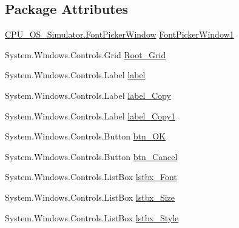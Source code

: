 \subsection*{Package Attributes}
\begin{DoxyCompactItemize}
\item 
\hyperlink{class_c_p_u___o_s___simulator_1_1_font_picker_window}{C\+P\+U\+\_\+\+O\+S\+\_\+\+Simulator.\+Font\+Picker\+Window} \hyperlink{class_c_p_u___o_s___simulator_1_1_font_picker_window_afb8444d85c5401e08689ca4ad477703a}{Font\+Picker\+Window1}
\item 
System.\+Windows.\+Controls.\+Grid \hyperlink{class_c_p_u___o_s___simulator_1_1_font_picker_window_a549891835e07203b79f3e81fb225c596}{Root\+\_\+\+Grid}
\item 
System.\+Windows.\+Controls.\+Label \hyperlink{class_c_p_u___o_s___simulator_1_1_font_picker_window_ada73b11773a6ec5fbddb19ee96bb131b}{label}
\item 
System.\+Windows.\+Controls.\+Label \hyperlink{class_c_p_u___o_s___simulator_1_1_font_picker_window_a25630ec7b1b5e76da6c7296d267067c9}{label\+\_\+\+Copy}
\item 
System.\+Windows.\+Controls.\+Label \hyperlink{class_c_p_u___o_s___simulator_1_1_font_picker_window_a8e7e6065c838bf76e919401eff15a2be}{label\+\_\+\+Copy1}
\item 
System.\+Windows.\+Controls.\+Button \hyperlink{class_c_p_u___o_s___simulator_1_1_font_picker_window_a7fda867379bdd5f59a54822628d80aca}{btn\+\_\+\+O\+K}
\item 
System.\+Windows.\+Controls.\+Button \hyperlink{class_c_p_u___o_s___simulator_1_1_font_picker_window_ad6c32f2add6a3395a8e798bdcdfbaa2c}{btn\+\_\+\+Cancel}
\item 
System.\+Windows.\+Controls.\+List\+Box \hyperlink{class_c_p_u___o_s___simulator_1_1_font_picker_window_a5ab20fca6d1149f954e66643491e3f0e}{lstbx\+\_\+\+Font}
\item 
System.\+Windows.\+Controls.\+List\+Box \hyperlink{class_c_p_u___o_s___simulator_1_1_font_picker_window_a8d7855c50915b0975ee314de961c00d5}{lstbx\+\_\+\+Size}
\item 
System.\+Windows.\+Controls.\+List\+Box \hyperlink{class_c_p_u___o_s___simulator_1_1_font_picker_window_adf923069128ca0ca766c810601319286}{lstbx\+\_\+\+Style}
\end{DoxyCompactItemize}
